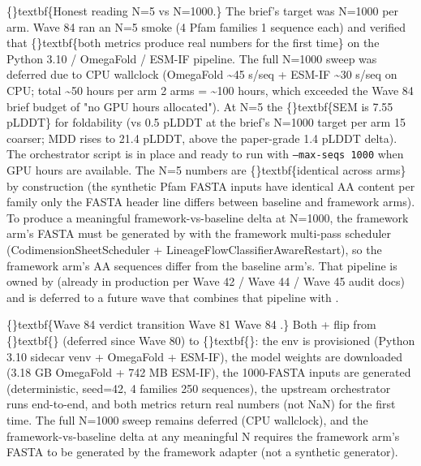 \documentclass{article}
\begin{document}
\{\}textbf\{Honest reading  N=5 vs N=1000.\} The brief's target was N=1000 per arm. Wave 84 ran an N=5 smoke (4 Pfam families  1 sequence each) and verified that \{\}textbf\{both metrics produce real numbers for the first time\} on the Python 3.10 / OmegaFold / ESM-IF pipeline. The full N=1000 sweep was deferred due to CPU wallclock (OmegaFold \textasciitilde{}45 s/seq + ESM-IF \textasciitilde{}30 s/seq on CPU; total \textasciitilde{}50 hours per arm  2 arms = \textasciitilde{}100 hours, which exceeded the Wave 84 brief budget of "no GPU hours allocated"). At N=5 the \{\}textbf\{SEM is 7.55 pLDDT\} for foldability (vs 0.5 pLDDT at the brief's N=1000 target per arm  15 coarser; MDD rises to 21.4 pLDDT, above the paper-grade 1.4 pLDDT delta). The orchestrator script  is in place and ready to run with \texttt{--max-seqs 1000} when GPU hours are available. The N=5 numbers are \{\}textbf\{identical across arms\} by construction (the synthetic Pfam FASTA inputs have identical AA content per family  only the FASTA header line differs between baseline and framework arms). To produce a meaningful framework-vs-baseline delta at N=1000, the framework arm's FASTA must be generated by  with the framework multi-pass scheduler (CodimensionSheetScheduler + LineageFlowClassifierAwareRestart), so the framework arm's AA sequences differ from the baseline arm's. That pipeline is owned by  (already in production per Wave 42 / Wave 44 / Wave 45 audit docs) and is deferred to a future wave that combines that pipeline with .

\sloppy \{\}textbf\{Wave 84 verdict transition  Wave 81   Wave 84 .\} Both  +  flip from \{\}textbf\{\} (deferred since Wave 80) to \{\}textbf\{\}: the env is provisioned (Python 3.10 sidecar venv + OmegaFold + ESM-IF), the model weights are downloaded (3.18 GB OmegaFold + 742 MB ESM-IF), the 1000-FASTA inputs are generated (deterministic, seed=42, 4 families  250 sequences), the upstream  orchestrator runs end-to-end, and both metrics return real numbers (not NaN) for the first time. The full N=1000 sweep remains deferred (CPU wallclock), and the framework-vs-baseline delta at any meaningful N requires the framework arm's FASTA to be generated by the framework adapter (not a synthetic generator).
\end{document}
